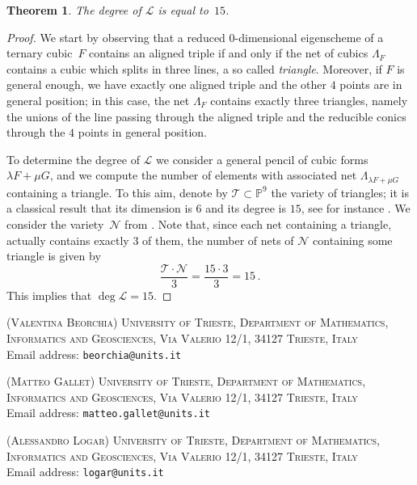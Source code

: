 \documentclass[11pt, a4paper, reqno, captions=tableheading,bibliography=totoc]{scrartcl}
\theoremstyle{plain}
\newtheorem{theorem}[lemma]{Theorem}
\theoremstyle{definition}
\newcommand{\p}{\mathbb{P}}
\begin{document}
\begin{theorem}
The degree of $\mathcal{L}$ is equal to~$15$.
\end{theorem}
\begin{proof}
We start by observing that a reduced $0$-dimensional eigenscheme of a ternary cubic~$F$ contains an aligned triple if and only if the net of cubics $\Lambda_F$ contains a cubic which splits in three lines, a so called \emph{triangle}. Moreover, if $F$ is general enough, we have exactly one aligned triple and the other $4$ points are in general position; in this case, the net $\Lambda_F$ contains exactly three triangles, namely the unions of the line passing through the aligned triple and the reducible conics through the $4$ points in general position.

To determine the degree of $\mathcal{L}$ we consider a general pencil of cubic forms $\lambda F + \mu G$, and we compute the number of elements with associated net $\Lambda_{\lambda F + \mu G}$ containing a triangle. To this aim, denote by $\mathcal{T} \subset \p^9$ the variety of triangles; it is a classical result that its dimension is $6$ and its degree is $15$, see for instance \cite[Section 2.2.2]{3264}. We consider the variety~$\mathcal{N}$ from .
Note that, since each net containing a triangle, actually contains exactly $3$ of them, the number of nets of $\mathcal{N}$ containing some triangle is given by
%
\[
\frac{\mathcal{T} \cdot {\mathcal N}}{3} = \frac{{15} \cdot {3}}{3} = 15 \,.
\]
%
This implies that $\deg \mathcal{L} = 15$.
\end{proof}





\bigskip
\bigskip

\textsc{(Valentina Beorchia) University of Trieste,
Department of Mathematics, Informatics and Geosciences,
Via Valerio 12/1, 34127 Trieste, Italy}\\
Email address: \texttt{beorchia@units.it}

\textsc{(Matteo Gallet) University of Trieste,
Department of Mathematics, Informatics and Geosciences,
Via Valerio 12/1, 34127 Trieste, Italy}\\
Email address: \texttt{matteo.gallet@units.it}

\textsc{(Alessandro Logar) University of Trieste,
Department of Mathematics, Informatics and Geosciences,
Via Valerio 12/1, 34127 Trieste, Italy}\\
Email address: \texttt{logar@units.it}
\end{document}
